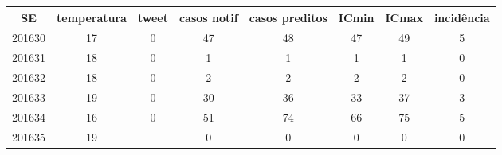 \begin{tabular}{c|ccccccc}
  \hline
SE & temperatura & tweet & casos notif & casos preditos & ICmin & ICmax & incidência \\ 
  \hline
201630 & 17 & 0 & 47 & 48 & 47 & 49 & 5 \\ 
  201631 & 18 & 0 & 1 & 1 & 1 & 1 & 0 \\ 
  201632 & 18 & 0 & 2 & 2 & 2 & 2 & 0 \\ 
  201633 & 19 & 0 & 30 & 36 & 33 & 37 & 3 \\ 
  201634 & 16 & 0 & 51 & 74 & 66 & 75 & 5 \\ 
  201635 & 19 &  & 0 & 0 & 0 & 0 & 0 \\ 
   \hline
\end{tabular}
